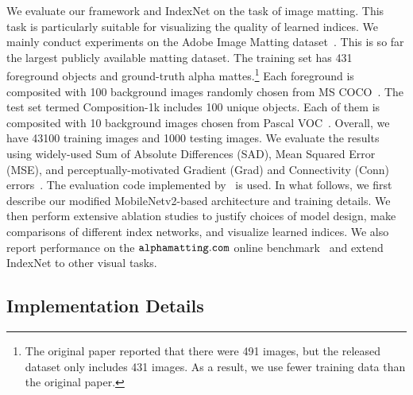 \documentclass[10pt,twocolumn,letterpaper]{article}
\begin{document}
We evaluate our framework and IndexNet on the task of image matting. This task is particularly suitable for visualizing the quality of learned indices. We mainly conduct experiments on the Adobe Image Matting dataset~\cite{xu2017deep}. This is so far the largest publicly available matting dataset. The training set has 431 foreground objects and ground-truth alpha mattes.\footnote{The original paper reported that there were 491 images, but the released dataset only includes 431 images.
As a result, we
use fewer
training data
than the original paper.}
Each foreground is composited with 100 background images randomly chosen from MS COCO~\cite{lin2014microsoft}. The test set termed Composition-1k includes 100 unique objects. Each of them is composited with 10 background images chosen from Pascal VOC~\cite{everingham2010pascal}. Overall, we have 43100 training images and 1000 testing images. We evaluate the results using widely-used Sum of Absolute Differences (SAD), Mean Squared Error (MSE), and perceptually-motivated Gradient (Grad) and Connectivity (Conn) errors~\cite{rhemann2009perceptually}. The evaluation code implemented by~\cite{xu2017deep} is used. In what follows, we first describe our modified MobileNetv2-based architecture and training details. We then perform extensive ablation studies to justify choices of model design, make comparisons of different index networks, and visualize learned indices. We also report performance on the $\tt alphamatting.com$ online benchmark~\cite{rhemann2009perceptually} and extend IndexNet to other visual tasks.

\subsection{Implementation Details}
\end{document}
